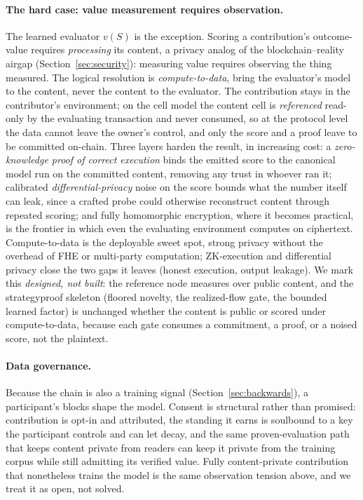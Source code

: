 \documentclass[10pt]{article}
\begin{document}
\paragraph{The hard case: value measurement requires observation.} The learned evaluator $v(S)$ is the
exception. Scoring a contribution's outcome-value requires \emph{processing} its content, a privacy
analog of the blockchain--reality airgap (Section~\ref{sec:security}): measuring value requires
observing the thing measured. The logical resolution is \emph{compute-to-data}, bring the evaluator's
model to the content, never the content to the evaluator. The contribution stays in the contributor's
environment; on the cell model the content cell is \emph{referenced} read-only by the evaluating
transaction and never consumed, so at the protocol level the data cannot leave the owner's control, and
only the score and a proof leave to be committed on-chain. Three layers harden the result, in increasing
cost: a \emph{zero-knowledge proof of correct execution} binds the emitted score to the canonical model
run on the committed content, removing any trust in whoever ran it; calibrated \emph{differential-privacy}
noise on the score bounds what the number itself can leak, since a crafted probe could otherwise
reconstruct content through repeated scoring; and fully homomorphic encryption, where it becomes
practical, is the frontier in which even the evaluating environment computes on ciphertext. Compute-to-data
is the deployable sweet spot, strong privacy without the overhead of FHE or multi-party computation;
ZK-execution and differential privacy close the two gaps it leaves (honest execution, output leakage).
We mark this \emph{designed, not built}: the reference node measures over public content, and the
strategyproof skeleton (floored novelty, the realized-flow gate, the bounded learned factor) is unchanged
whether the content is public or scored under compute-to-data, because each gate consumes a commitment, a
proof, or a noised score, not the plaintext.

\paragraph{Data governance.} Because the chain is also a training signal (Section~\ref{sec:backwards}), a
participant's blocks shape the model. Consent is structural rather than promised: contribution is opt-in
and attributed, the standing it earns is soulbound to a key the participant controls and can let decay,
and the same proven-evaluation path that keeps content private from readers can keep it private from the
training corpus while still admitting its verified value. Fully content-private contribution that
nonetheless trains the model is the same observation tension above, and we treat it as open, not solved.
\end{document}
